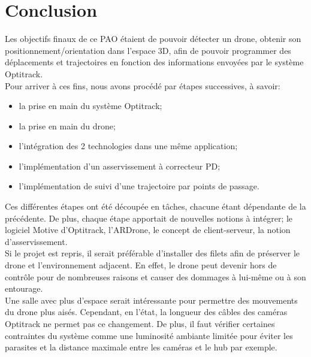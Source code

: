 \chapter{Conclusion}
    Les objectifs finaux de ce PAO étaient de pouvoir détecter un drone, obtenir son positionnement/orientation dans l'espace 3D, afin de pouvoir programmer des déplacements et trajectoires en fonction des informations envoyées par le système Optitrack. \\

    Pour arriver à ces fins, nous avons procédé par étapes successives, à savoir:
    \begin{itemize}
        \item la prise en main du système Optitrack;
        \item la prise en main du drone;
        \item l'intégration des 2 technologies dans une même application;
        \item l'implémentation d'un asservissement à correcteur PD\@;
        \item l'implémentation de suivi d'une trajectoire par points de passage. \\
    \end{itemize}

    Ces différentes étapes ont été découpée en tâches, chacune étant dépendante de la précédente. De plus, chaque étape apportait de nouvelles notions à intégrer; le logiciel Motive d'Optitrack, l'ARDrone, le concept de client-serveur, la notion d'asservissement. \\

    Si le projet est repris, il serait préférable d'installer des filets afin de préserver le drone et l'environnement adjacent. En effet, le drone peut devenir hors de contrôle pour de nombreuses raisons et causer des dommages à lui-même ou à son entourage. \\

    Une salle avec plus d'espace serait intéressante pour permettre des mouvements du drone plus aisés. Cependant, en l'état, la longueur des câbles des caméras Optitrack ne permet pas ce changement. De plus, il faut vérifier certaines contraintes du système comme une luminosité ambiante limitée pour éviter les parasites et la distance maximale entre les caméras et le hub par exemple.

